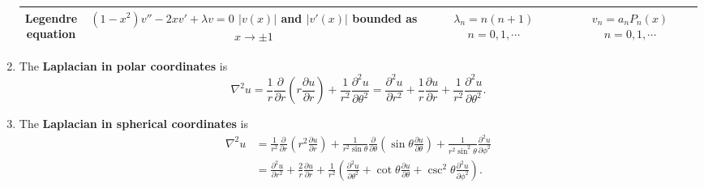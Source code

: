 \begin{enumerate}
\begin{center}
\begin{tabular}{|c|c|c|c|}
    \parbox[c][30pt]{90pt}{\centering \textbf{Legendre \\ \vspace{10pt} equation}} & 
    \parbox[c][80pt]{120pt}{\centering $(1-x^{2})v'' -2x v'+ \lambda v=0$ \\ \vspace{10pt} $|v(x)|$ and $|v'(x)|$ \\ \vspace{10pt} bounded as $x\to \pm 1$}
    & 
    \parbox[c][60pt]{100pt}{\centering $\displaystyle \lambda_{n}=n(n+1)$ \\ \vspace{10pt} $n=0, 1, \cdots$} & 
    \parbox[c][60pt]{120pt}{\centering $ v_{n} = a_{n}P_{ n} (x)$\\ \vspace{10pt} $n=0, 1, \cdots$} \\
    \hline
\end{tabular}
\end{center}

\item The \textbf{Laplacian in polar coordinates} is
\[\nabla^{2} u = \frac{1}{r}\frac{\partial}{\partial r}\left( r\frac{\partial u}{\partial r} \right) +\frac{1}{r^{2}}\frac{\partial^{2} u}{\partial \theta^{2}} = \frac{\partial^{2} u}{\partial r^{2}} + \frac{1}{r}\frac{\partial u}{\partial r} + \frac{1}{r^{2}}\frac{\partial^{2} u}{\partial \theta^{2}}.\]

\item The \textbf{Laplacian in spherical coordinates} is
\[
\begin{aligned}\nabla^{2} u & = \frac{1}{r^{2}}\frac{\partial}{\partial r}\left( r^{2} \frac{\partial u}{\partial r} \right) + \frac{1}{r^{2}\sin \theta} \frac{\partial}{\partial \theta}\left( \sin\theta \frac{\partial u}{\partial \theta} \right) + \frac{1}{r^{2}\sin^{2}\theta} \frac{\partial^{2} u}{\partial \phi^{2}} \\
& = \frac{\partial^{2} u}{\partial r^{2}} + \frac{2}{r}\frac{\partial u}{\partial r} + \frac{1}{r^{2}}\left( \frac{\partial^{2} u}{\partial \theta^{2}} + \cot \theta \frac{\partial u}{\partial \theta} + \csc^{2}\theta \frac{\partial^{2}u}{\partial \phi^{2}} \right).
\end{aligned}
\]




\end{enumerate}





